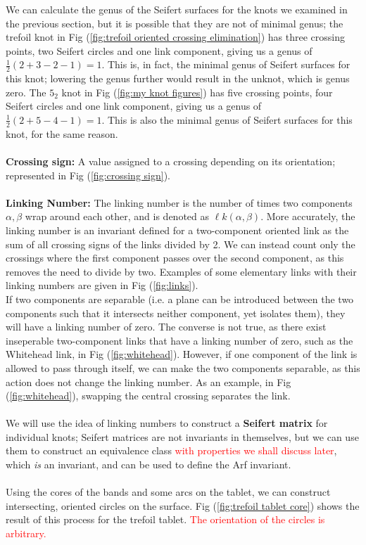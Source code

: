 \documentclass{article}
\begin{document}
We can calculate the genus of the Seifert surfaces for the knots we examined in the previous section, but it is possible that they are not of minimal genus; the trefoil knot in Fig (\ref{fig:trefoil oriented crossing elimination}) has three crossing points, two Seifert circles and one link component, giving us a genus of $\frac{1}{2}(2+3-2-1)=1$. This is, in fact, the minimal genus of Seifert surfaces for this knot; lowering the genus further would result in the unknot, which is genus zero. The $5_2$ knot in Fig (\ref{fig:my knot figures}) has five crossing points, four Seifert circles and one link component, giving us a genus of $\frac{1}{2}(2+5-4-1)=1$. This is also the minimal genus of Seifert surfaces for this knot, for the same reason.\\
\\
\textbf{Crossing sign:} A value assigned to a crossing depending on its orientation; represented in Fig (\ref{fig:crossing sign}).\\
\\
\textbf{Linking Number:} The linking number is the number of times two components $\alpha, \beta$  wrap around each other, and is denoted as $\ell k(\alpha,\beta)$. More accurately, the linking number is an invariant defined for a two-component oriented link as the sum of all crossing signs of the links divided by 2. We can instead count only the crossings where the first component passes over the second component, as this removes the need to divide by two. Examples of some elementary links with their linking numbers are given in Fig (\ref{fig:links}).\\

If two components are separable (i.e. a plane can be introduced between the two components such that it intersects neither component, yet isolates them), they will have a linking number of zero. The converse is not true, as there exist inseperable two-component links that have a linking number of zero, such as the Whitehead link, in Fig (\ref{fig:whitehead}). However, if one component of the link is allowed to pass through itself, we can make the two components separable, as this action does not change the linking number. As an example, in Fig (\ref{fig:whitehead}), swapping the central crossing separates the link.\\
\\
We will use the idea of linking numbers to construct a \textbf{Seifert matrix} for individual knots; Seifert matrices are not invariants in themselves, but we can use them to construct an equivalence class \textcolor{red}{with properties we shall discuss later}, which \emph{is} an invariant, and can be used to define the Arf invariant.\\
\\
Using the cores of the bands and some arcs on the tablet, we can construct intersecting, oriented circles on the surface. Fig (\ref{fig:trefoil tablet core}) shows the result of this process for the trefoil tablet. \textcolor{red}{The orientation of the circles is arbitrary.}\\
\end{document}
